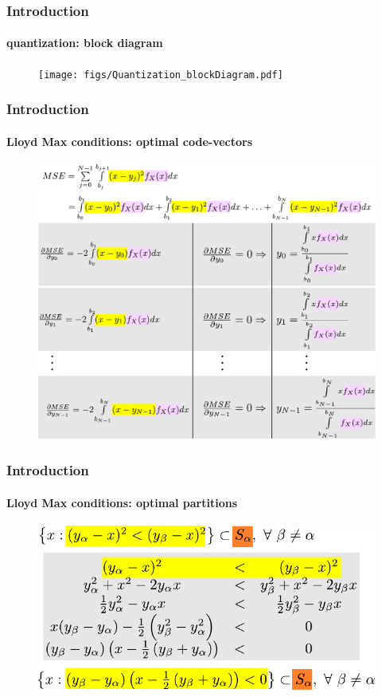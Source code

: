 \begin{frame}
\frametitle{Introduction}
\framesubtitle{quantization: block diagram}
\logoCSIPCPL\mypagenum
	\begin{figure}				
		\texttt{[image: figs/Quantization\_blockDiagram.pdf]}
	\end{figure}
\end{frame}




\begin{frame}[plain]
\frametitle{Introduction}
\framesubtitle{Lloyd Max conditions: optimal code-vectors}
\logoCSIPCPL\mypagenum
	\begin{changemargin}{-1.3in}{0in}
		\begin{figure}				
			\includegraphics[height=0.8\textheight]{figs/Quantization_optimalCodevectors.pdf}
		\end{figure}
	\end{changemargin}
\end{frame}



\begin{frame}
\frametitle{Introduction}
\framesubtitle{Lloyd Max conditions: optimal partitions}
\logoCSIPCPL\mypagenum
	\begin{figure}				
		\includegraphics[width=1.0\textwidth]{figs/Quantization_optimalPartitions.pdf}
	\end{figure}
\end{frame}



